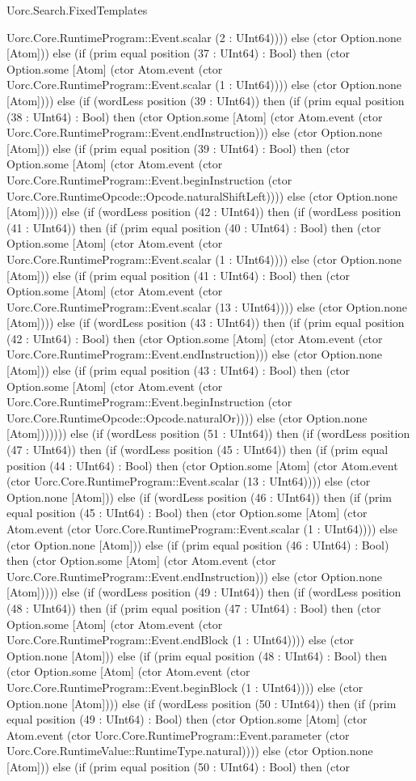 \begin{lexlean}{Uorc.Search.FixedTemplates}
\begin{semanticmodule}
{Uorc.Core.RuntimeProgram::Event.scalar (2 : UInt64)))) else (ctor Option.none [Atom])) else (if (prim equal position (37 : UInt64) : Bool) then (ctor Option.some [Atom] (ctor Atom.event (ctor Uorc.Core.RuntimeProgram::Event.scalar (1 : UInt64)))) else (ctor Option.none [Atom]))) else (if (wordLess position (39 : UInt64)) then (if (prim equal position (38 : UInt64) : Bool) then (ctor Option.some [Atom] (ctor Atom.event (ctor Uorc.Core.RuntimeProgram::Event.endInstruction))) else (ctor Option.none [Atom])) else (if (prim equal position (39 : UInt64) : Bool) then (ctor Option.some [Atom] (ctor Atom.event (ctor Uorc.Core.RuntimeProgram::Event.beginInstruction (ctor Uorc.Core.RuntimeOpcode::Opcode.naturalShiftLeft)))) else (ctor Option.none [Atom])))) else (if (wordLess position (42 : UInt64)) then (if (wordLess position (41 : UInt64)) then (if (prim equal position (40 : UInt64) : Bool) then (ctor Option.some [Atom] (ctor Atom.event (ctor Uorc.Core.RuntimeProgram::Event.scalar (1 : UInt64)))) else (ctor Option.none [Atom])) else (if (prim equal position (41 : UInt64) : Bool) then (ctor Option.some [Atom] (ctor Atom.event (ctor Uorc.Core.RuntimeProgram::Event.scalar (13 : UInt64)))) else (ctor Option.none [Atom]))) else (if (wordLess position (43 : UInt64)) then (if (prim equal position (42 : UInt64) : Bool) then (ctor Option.some [Atom] (ctor Atom.event (ctor Uorc.Core.RuntimeProgram::Event.endInstruction))) else (ctor Option.none [Atom])) else (if (prim equal position (43 : UInt64) : Bool) then (ctor Option.some [Atom] (ctor Atom.event (ctor Uorc.Core.RuntimeProgram::Event.beginInstruction (ctor Uorc.Core.RuntimeOpcode::Opcode.naturalOr)))) else (ctor Option.none [Atom])))))) else (if (wordLess position (51 : UInt64)) then (if (wordLess position (47 : UInt64)) then (if (wordLess position (45 : UInt64)) then (if (prim equal position (44 : UInt64) : Bool) then (ctor Option.some [Atom] (ctor Atom.event (ctor Uorc.Core.RuntimeProgram::Event.scalar (13 : UInt64)))) else (ctor Option.none [Atom])) else (if (wordLess position (46 : UInt64)) then (if (prim equal position (45 : UInt64) : Bool) then (ctor Option.some [Atom] (ctor Atom.event (ctor Uorc.Core.RuntimeProgram::Event.scalar (1 : UInt64)))) else (ctor Option.none [Atom])) else (if (prim equal position (46 : UInt64) : Bool) then (ctor Option.some [Atom] (ctor Atom.event (ctor Uorc.Core.RuntimeProgram::Event.endInstruction))) else (ctor Option.none [Atom])))) else (if (wordLess position (49 : UInt64)) then (if (wordLess position (48 : UInt64)) then (if (prim equal position (47 : UInt64) : Bool) then (ctor Option.some [Atom] (ctor Atom.event (ctor Uorc.Core.RuntimeProgram::Event.endBlock (1 : UInt64)))) else (ctor Option.none [Atom])) else (if (prim equal position (48 : UInt64) : Bool) then (ctor Option.some [Atom] (ctor Atom.event (ctor Uorc.Core.RuntimeProgram::Event.beginBlock (1 : UInt64)))) else (ctor Option.none [Atom]))) else (if (wordLess position (50 : UInt64)) then (if (prim equal position (49 : UInt64) : Bool) then (ctor Option.some [Atom] (ctor Atom.event (ctor Uorc.Core.RuntimeProgram::Event.parameter (ctor Uorc.Core.RuntimeValue::RuntimeType.natural)))) else (ctor Option.none [Atom])) else (if (prim equal position (50 : UInt64) : Bool) then (ctor }
\end{semanticmodule}
\end{lexlean}
